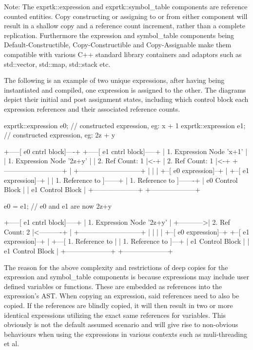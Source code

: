 Note: The exprtk::expression  and exprtk::symbol\_table components  are
reference counted entities. Copy constructing or assigning to or  from
either component will result in  a shallow copy and a  reference count
increment,  rather  than  a  complete  replication.  Furthermore   the
expression  and symbol\_table  components being  Default-Constructible,
Copy-Constructible  and  Copy-Assignable  make  them  compatible  with
various  C++  standard  library   containers  and  adaptors  such   as
std::vector, std::map, std::stack etc.

The following is  an example of  two unique expressions,  after having
being instantiated and  compiled, one expression  is  assigned to  the
other. The diagrams depict  their initial and post  assignment states,
including  which  control  block each  expression references and their
associated reference counts.


exprtk::expression e0; // constructed expression, eg: x + 1
exprtk::expression e1; // constructed expression, eg: 2z + y

+-----[ e0 cntrl block]----+     +-----[ e1 cntrl block]-----+
| 1. Expression Node 'x+1' |     | 1. Expression Node '2z+y' |
| 2. Ref Count: 1          |<-+  | 2. Ref Count: 1           |<-+
+--------------------------+  |  +---------------------------+  |
|                                 |
+--[ e0 expression]--+      |    +--[ e1 expression]--+       |
| 1. Reference to    ]------+    | 1. Reference to    ]-------+
| e0 Control Block   |           | e1 Control Block   |
+--------------------+           +--------------------+


e0 = e1; // e0 and e1 are now 2z+y

+-----[ e1 cntrl block]-----+
| 1. Expression Node '2z+y' |
+----------->| 2. Ref Count: 2           |<----------+
|            +---------------------------+           |
|                                                    |
|   +--[ e0 expression]--+  +--[ e1 expression]--+   |
+---[ 1. Reference to    |  | 1. Reference to    ]---+
| e1 Control Block   |  | e1 Control Block   |
+--------------------+  +--------------------+

The reason for  the above complexity  and restrictions of  deep copies
for the expression and symbol\_table components is because  expressions
may include user defined variables or functions. These are embedded as
references into the expression's AST. When copying an expression, said
references  need to  also  be  copied. If  the references  are blindly
copied,  it  will then  result  in two  or more  identical expressions
utilizing the exact same  references for variables. This  obviously is
not the  default assumed  scenario and  will give  rise to non-obvious
behaviours  when  using the  expressions in  various contexts such  as
muli-threading et al.

